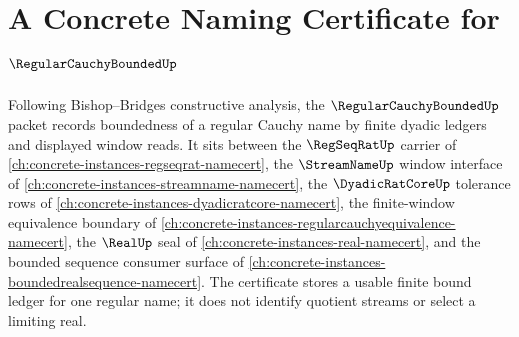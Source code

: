 \chapter{A Concrete Naming Certificate for $\RegularCauchyBoundedUp$}
\label{ch:concrete-instances-regularcauchybounded-namecert}

Following Bishop--Bridges constructive analysis, the $\RegularCauchyBoundedUp$ packet records boundedness of a regular Cauchy name by finite dyadic ledgers and displayed window reads. It sits between the $\RegSeqRatUp$ carrier of \autoref{ch:concrete-instances-regseqrat-namecert}, the $\StreamNameUp$ window interface of \autoref{ch:concrete-instances-streamname-namecert}, the $\DyadicRatCoreUp$ tolerance rows of \autoref{ch:concrete-instances-dyadicratcore-namecert}, the finite-window equivalence boundary of \autoref{ch:concrete-instances-regularcauchyequivalence-namecert}, the $\RealUp$ seal of \autoref{ch:concrete-instances-real-namecert}, and the bounded sequence consumer surface of \autoref{ch:concrete-instances-boundedrealsequence-namecert}. The certificate stores a usable finite bound ledger for one regular name; it does not identify quotient streams or select a limiting real.


